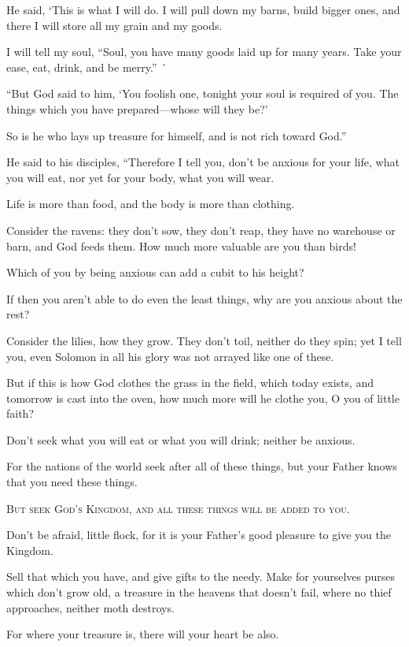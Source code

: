 He said, ‘This is what I will do. I will pull down my barns, build bigger ones, and there I will store all my grain and my goods.

I will tell my soul, “Soul, you have many goods laid up for many years. Take your ease, eat, drink, and be merry.” ’

“But God said to him, ‘You foolish one, tonight your soul is required of you. The things which you have prepared—whose will they be?’

So is he who lays up treasure for himself, and is not rich toward God.”

He said to his disciples, “Therefore I tell you, don’t be anxious for your life, what you will eat, nor yet for your body, what you will wear.

Life is more than food, and the body is more than clothing.

Consider the ravens: they don’t sow, they don’t reap, they have no warehouse or barn, and God feeds them. How much more valuable are you than birds!

Which of you by being anxious can add a cubit to his height?

If then you aren’t able to do even the least things, why are you anxious about the rest?

Consider the lilies, how they grow. They don’t toil, neither do they spin; yet I tell you, even Solomon in all his glory was not arrayed like one of these.

But if this is how God clothes the grass in the field, which today exists, and tomorrow is cast into the oven, how much more will he clothe you, O you of little faith?

Don’t seek what you will eat or what you will drink; neither be anxious.

For the nations of the world seek after all of these things, but your Father knows that you need these things.




\lettrine{B}{ut seek God’s Kingdom, and all these things will be added to you.}

Don’t be afraid, little flock, for it is your Father’s good pleasure to give you the Kingdom.

Sell that which you have, and give gifts to the needy. Make for yourselves purses which don’t grow old, a treasure in the heavens that doesn’t fail, where no thief approaches, neither moth destroys.

For where your treasure is, there will your heart be also.


